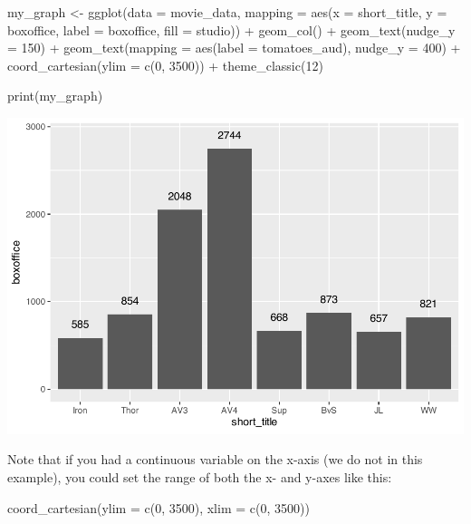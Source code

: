\documentclass[
]{krantz}
\makeatletter
\newenvironment{Shaded}{\begin{snugshade}}{\end{snugshade}}
\newcommand{\AttributeTok}[1]{\textcolor[rgb]{0.61,0.61,0.61}{#1}}
\newcommand{\DecValTok}[1]{\textcolor[rgb]{0.06,0.06,0.06}{#1}}
\newcommand{\FunctionTok}[1]{\textcolor[rgb]{0,0,0}{#1}}
\newcommand{\NormalTok}[1]{#1}
\newcommand{\OtherTok}[1]{\textcolor[rgb]{0.37,0.37,0.37}{#1}}
\newcommand{\SpecialCharTok}[1]{\textcolor[rgb]{0,0,0}{#1}}
\newenvironment{kframe}{%
\medskip{}
\setlength{\fboxsep}{.8em}
 \def\at@end@of@kframe{}%
 \ifinner\ifhmode%
  \def\at@end@of@kframe{\end{minipage}}%
  \begin{minipage}{\columnwidth}%
 \fi\fi%
 \def\FrameCommand##1{\hskip\@totalleftmargin \hskip-\fboxsep
 \colorbox{shadecolor}{##1}\hskip-\fboxsep
     \hskip-\linewidth \hskip-\@totalleftmargin \hskip\columnwidth}%
 \MakeFramed {\advance\hsize-\width
   \@totalleftmargin\z@ \linewidth\hsize
   \@setminipage}}%
 {\par\unskip\endMakeFramed%
 \at@end@of@kframe}
\renewenvironment{Shaded}{\begin{kframe}}{\end{kframe}}
\makeatother
\begin{document}
\begin{Shaded}
\begin{Highlighting}[]
\NormalTok{my\_graph }\OtherTok{\textless{}{-}} \FunctionTok{ggplot}\NormalTok{(}\AttributeTok{data =}\NormalTok{ movie\_data,}
           \AttributeTok{mapping =} \FunctionTok{aes}\NormalTok{(}\AttributeTok{x =}\NormalTok{ short\_title,}
                         \AttributeTok{y =}\NormalTok{ boxoffice,}
                         \AttributeTok{label =}\NormalTok{ boxoffice, }
                         \AttributeTok{fill =}\NormalTok{ studio)) }\SpecialCharTok{+}
  \FunctionTok{geom\_col}\NormalTok{() }\SpecialCharTok{+}
  \FunctionTok{geom\_text}\NormalTok{(}\AttributeTok{nudge\_y =} \DecValTok{150}\NormalTok{)  }\SpecialCharTok{+}
  \FunctionTok{geom\_text}\NormalTok{(}\AttributeTok{mapping =} \FunctionTok{aes}\NormalTok{(}\AttributeTok{label =}\NormalTok{ tomatoes\_aud), }
            \AttributeTok{nudge\_y =} \DecValTok{400}\NormalTok{) }\SpecialCharTok{+}
  \FunctionTok{coord\_cartesian}\NormalTok{(}\AttributeTok{ylim =} \FunctionTok{c}\NormalTok{(}\DecValTok{0}\NormalTok{, }\DecValTok{3500}\NormalTok{)) }\SpecialCharTok{+}
  \FunctionTok{theme\_classic}\NormalTok{(}\DecValTok{12}\NormalTok{)}


\FunctionTok{print}\NormalTok{(my\_graph)}
\end{Highlighting}
\end{Shaded}

\includegraphics[width=0.65\linewidth]{bookdown_files/figure-latex/unnamed-chunk-117-1}

Note that if you had a continuous variable on the x-axis (we do not in this example), you could set the range of both the x- and y-axes like this:

\begin{Shaded}
\begin{Highlighting}[]
\FunctionTok{coord\_cartesian}\NormalTok{(}\AttributeTok{ylim =} \FunctionTok{c}\NormalTok{(}\DecValTok{0}\NormalTok{, }\DecValTok{3500}\NormalTok{),}
                \AttributeTok{xlim =} \FunctionTok{c}\NormalTok{(}\DecValTok{0}\NormalTok{, }\DecValTok{3500}\NormalTok{))}
\end{Highlighting}
\end{Shaded}
\end{document}
